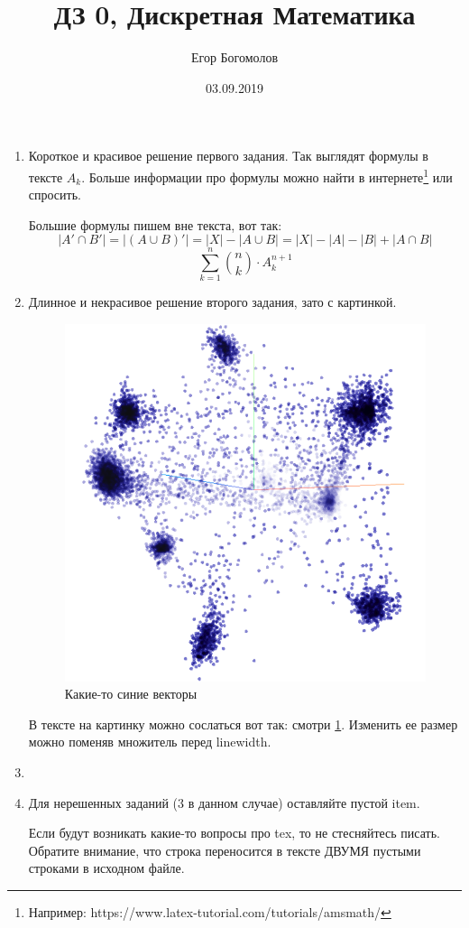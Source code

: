 \documentclass[12pt]{article}
\title{ДЗ 0, Дискретная Математика}
\author{Егор Богомолов}
\date{03.09.2019}
\begin{document}
\maketitle

\begin{enumerate}
\item %
Короткое и красивое решение первого задания. Так выглядят формулы в тексте $A_k$. Больше информации про формулы можно найти в интернете\footnote{Например: https://www.latex-tutorial.com/tutorials/amsmath/} или спросить.

Большие формулы пишем вне текста, вот так:
$$
|A'\cap B'|=|(A\cup B)'|=|X|-|A\cup B|=|X|-|A|-|B|+|A\cap B|
$$
$$
\sum\limits_{k=1}^{n} \binom{n}{k} \cdot A_k^{n+1}
$$

\item %
Длинное и некрасивое решение второго задания, зато с картинкой.

\begin{figure}[h]
\centering
 \includegraphics[width=0.5\linewidth]{figures/picture-01.png}
 \caption{Какие-то синие векторы}
 \label{fig:vectors}
\end{figure}

В тексте на картинку можно сослаться вот так: смотри \cref{fig:vectors}. Изменить ее размер можно поменяв множитель перед linewidth.

\item %
\item %
Для нерешенных заданий (3 в данном случае) оставляйте пустой item.

Если будут возникать какие-то вопросы про tex, то не стесняйтесь писать.
Обратите внимание, что строка переносится в тексте ДВУМЯ пустыми строками в исходном файле.
\end{enumerate}
\end{document}
